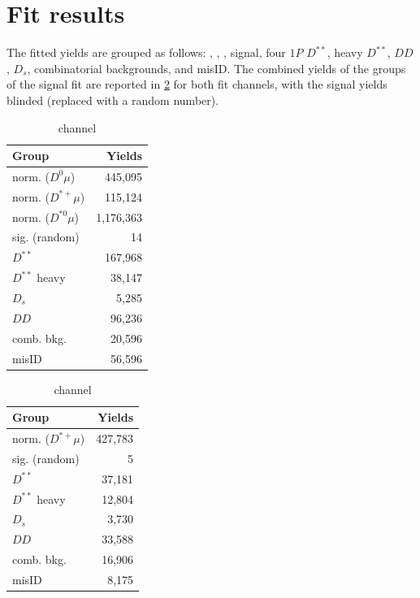\section{Fit results}
\label{ref:fit:results}

The fitted yields are grouped as follows:
\Dz\muon, \Dstarp\muon, \Dstarz\muon,
signal,
four $1P$ $D^{**}$,
heavy $D^{**}$,
$DD$,
$D_s$,
combinatorial backgrounds,
and \muon misID.
The combined yields of the groups of the signal fit are reported in
\cref{tab:fit-yields} for both fit channels,
with the signal yields blinded (replaced with a random number).

\begin{table}[!ht]
    \centering
    \caption{Fitted yields of the signal fit.}
    \label{tab:fit-yields}

\begin{subtable}[b]{0.5\textwidth}
    \centering

\begin{tabular}[b]{lr}
\hline
 Group               &    Yields \\
\hline
 norm. ($D^0\mu$)    &   445,095 \\
 norm. ($D^{*+}\mu$) &   115,124 \\
 norm. ($D^{*0}\mu$) & 1,176,363 \\
 sig. (random)       &        14 \\
 $D^{**}$            &   167,968 \\
 $D^{**}$ heavy      &    38,147 \\
 $D_s$               &     5,285 \\
 $DD$                &    96,236 \\
 comb. bkg.          &    20,596 \\
 misID               &    56,596 \\
\hline
\end{tabular}

    \caption{\Dz channel}
\end{subtable}%
\begin{subtable}[b]{0.5\textwidth}
    \centering

\begin{tabular}[b]{lr}
\hline
 Group               &   Yields \\
\hline
 norm. ($D^{*+}\mu$) &  427,783 \\
 sig. (random)       &        5 \\
 $D^{**}$            &   37,181 \\
 $D^{**}$ heavy      &   12,804 \\
 $D_s$               &    3,730 \\
 $DD$                &   33,588 \\
 comb. bkg.          &   16,906 \\
 misID               &    8,175 \\
\hline
\end{tabular}

    \caption{\Dstar channel}
\end{subtable}

\end{table}


